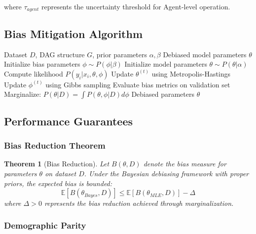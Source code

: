 \documentclass[12pt,a4paper]{article}
\newtheorem{theorem}{Theorem}
\begin{document}
where $\tau_{agent}$ represents the uncertainty threshold for Agent-level operation.

\subsection{Bias Mitigation Algorithm}

\begin{algorithm}
\caption{Bayesian Bias Mitigation in OBIAI}
\begin{algorithmic}[1]
\Require Dataset $D$, DAG structure $G$, prior parameters $\alpha, \beta$
\Ensure Debiased model parameters $\theta$
\State Initialize bias parameters $\phi \sim P(\phi|\beta)$
\State Initialize model parameters $\theta \sim P(\theta|\alpha)$
        \State Compute likelihood $P(y_i|x_i, \theta, \phi)$
        \State Update $\theta^{(t)}$ using Metropolis-Hastings
        \State Update $\phi^{(t)}$ using Gibbs sampling
    \EndFor
    \State Evaluate bias metrics on validation set
\EndFor
\State Marginalize: $P(\theta|D) = \int P(\theta, \phi|D) d\phi$
\State \Return Debiased parameters $\theta$
\end{algorithmic}
\end{algorithm}

\subsection{Performance Guarantees}

\subsubsection{Bias Reduction Theorem}

\begin{theorem}[Bias Reduction]
Let $B(\theta, D)$ denote the bias measure for parameters $\theta$ on dataset $D$. Under the Bayesian debiasing framework with proper priors, the expected bias is bounded:
\begin{equation}
\mathbb{E}[B(\theta_{Bayes}, D)] \leq \mathbb{E}[B(\theta_{MLE}, D)] - \Delta
\end{equation}
where $\Delta > 0$ represents the bias reduction achieved through marginalization.
\end{theorem}

\subsubsection{Demographic Parity}
\end{document}
